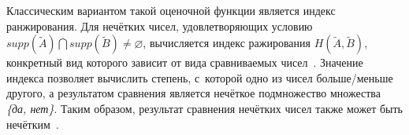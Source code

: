 Классическим вариантом такой оценочной функции является индекс ранжирования. Для нечётких чисел, удовлетворяющих условию $supp \left( \tilde A \right) \bigcap supp \left( \tilde B \right) \neq \varnothing$, вычисляется индекс ражирования $H\left(\tilde A, \tilde B \right)$, конкретный вид которого зависит от вида сравниваемых чисел~\cite{Borisov_Alexeev_Msk, Skorokhod, Borisov_Fedulov_Arithmetics}. Значение индекса позволяет вычислить степень, с~которой одно из чисел больше/меньше другого, а результатом сравнения является нечёткое подмножество множества \textit{ \{да, нет\}}. Таким образом, результат сравнения нечётких чисел также может быть нечётким~\cite{Siler_Buckley}.